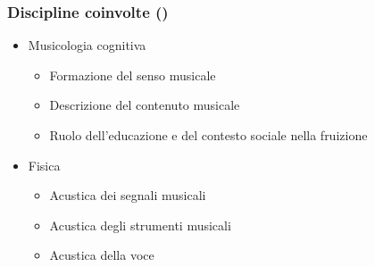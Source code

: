 %
%
% 
% 
% 
%

\setcounter{ms}{0}
\begin{frame}
    \frametitle{Discipline coinvolte ()}

    \begin{itemize}
        \item{Musicologia cognitiva
            \begin{itemize}
                \item{Formazione del senso musicale}
                \item{Descrizione del contenuto musicale}
                \item{Ruolo dell'educazione e del contesto sociale nella
                    fruizione}
            \end{itemize}}
        \item{Fisica
            \begin{itemize}
                \item{Acustica dei segnali musicali}
                \item{Acustica degli strumenti musicali}
                \item{Acustica della voce}
            \end{itemize}}
    \end{itemize}
    
\end{frame}

